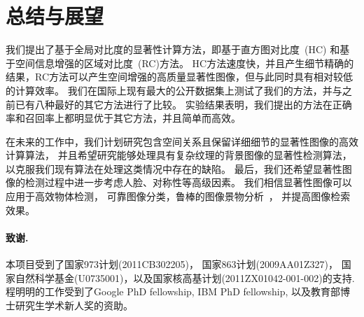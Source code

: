 \documentclass[final]{cvpr}
\begin{document}

\section{总结与展望}\label{sec:Conclusion}
我们提出了基于全局对比度的显著性计算方法，即基于直方图对比度~(HC) 和基于空间信息增强的区域对比度~(RC)方法。
HC方法速度快，并且产生细节精确的结果，RC方法可以产生空间增强的高质量显著性图像，但与此同时具有相对较低的计算效率。
我们在国际上现有最大的公开数据集上测试了我们的方法，并与之前已有八种最好的其它方法进行了比较。
实验结果表明，我们提出的方法在正确率和召回率上都明显优于其它方法，并且简单而高效。

在未来的工作中，我们计划研究包含空间关系且保留详细细节的显著性图像的高效计算算法，
并且希望研究能够处理具有复杂纹理的背景图像的显著性检测算法，
以克服我们现有算法在处理这类情况中存在的缺陷。
最后，我们还希望显著性图像的检测过程中进一步考虑人脸、对称性等高级因素。
我们相信显著性图像可以应用于高效物体检测\cite{06TCSVT/han_unsupervised}，
可靠图像分类，鲁棒的图像景物分析~\cite{journal/tog/ChengZMHH10}，
并提高图像检索效果\cite{tog09/ChenCT_Sketch2Photo}。


\paragraph{致谢.} 本项目受到了国家973计划(2011CB302205)， 国家863计划(2009AA01Z327)，
国家自然科学基金(U0735001)，以及国家核高基计划(2011ZX01042-001-002)的支持.
程明明的工作受到了Google PhD fellowship, IBM PhD fellowship, 以及教育部博士研究生学术新人奖的资助。

{\small


}

\end{document}
